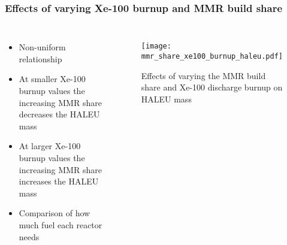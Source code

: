 \begin{frame}
    \frametitle{Effects of varying Xe-100 burnup and MMR build share}
    \begin{columns}

        \column[t]{4cm}
        \begin{itemize}
            \item Non-uniform relationship
            \item At smaller Xe-100 burnup values the increasing MMR 
                  share decreases the HALEU mass
            \item At larger Xe-100 burnup values the increasing MMR share 
                  increases the HALEU mass
            \item Comparison of how much fuel each reactor needs
        \end{itemize}

    \column[t]{6cm}
    \vspace{-1cm}
    \begin{figure}
        \centering 
            \texttt{[image: mmr\_share\_xe100\_burnup\_haleu.pdf]}
            \caption{Effects of varying the MMR build share and 
            Xe-100 discharge burnup on HALEU mass}
            \label{fig:mmr_share_xe100_bu}
    \end{figure}

\end{columns}
\end{frame}

